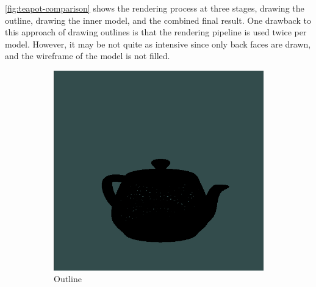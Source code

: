 
\autoref{fig:teapot-comparison} shows the rendering process at three stages, drawing the outline,
drawing the inner model, and the combined final result. One drawback to this approach of drawing
outlines is that the rendering pipeline is used twice per model. However, it may be not quite as 
intensive since only back faces are drawn, and the wireframe of the model is not filled.



\begin{figure}[h]
    \centering
    \begin{subfigure}[b]{0.2\textwidth}
        \includegraphics[width=\textwidth]{img/teapot-wireframe.png}
        \caption{Outline}
        \label{fig:outline-render}
    \end{subfigure}
    ~
    \begin{subfigure}[b]{0.2\textwidth}

\end{subfigure}
\end{figure}
